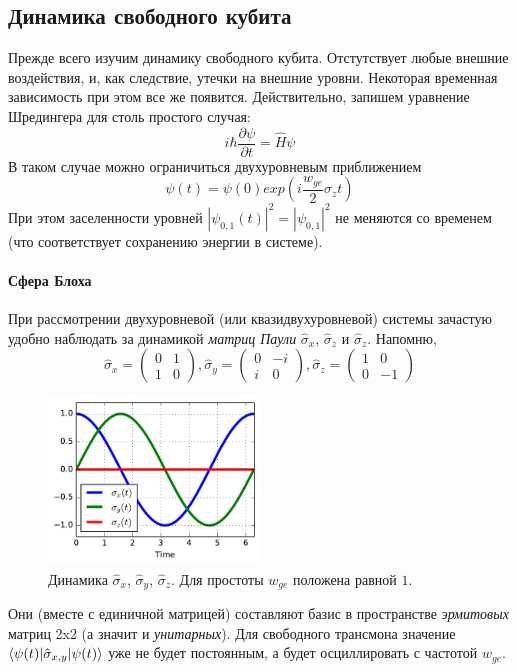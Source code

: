 \documentclass[12pt, twoside]{report}
\DeclarePairedDelimiter\bra{\langle}{\rvert}
\DeclarePairedDelimiter\ket{\lvert}{\rangle}
\numberwithin{equation}{section}
\numberwithin{figure}{section}
\begin{document}
\subsection{Динамика свободного кубита}
Прежде всего изучим динамику свободного кубита. Отстутствует любые внешние воздействия, и, как следствие, утечки на внешние уровни. Некоторая временная зависимость при этом все же появится. Действительно, запишем уравнение Шредингера для столь простого случая:
\begin{equation}
i \hbar \frac{\partial \psi} {\partial t} = \hat{H} \psi 
\label{eq:shrodinger-eq-simpliest-2d}
\end{equation}
В таком случае можно ограничиться двухуровневым приближением
\begin{equation}
\psi(t) = \psi(0) exp\left(i \frac{w_{ge}}{2} \hat{\sigma}_z t\right) 
\label{eq:shrodinger-sol-simpliest-2d}
\end{equation}
При этом заселенности уровней $|\psi_{0,1}(t)|^2 = |\psi_{0,1}|^2$ не меняются со временем (что соответствует сохранению энергии в системе). 
\paragraph{Сфера Блоха} При рассмотрении двухуровневой (или квазидвухуровневой) системы зачастую удобно наблюдать за динамикой \textit{матриц Паули} $\hat{\sigma}_x$, $\hat{\sigma}_z$ и $\hat{\sigma}_z$. Напомню, 
\begin{equation}
\hat{\sigma}_x = \left(\begin{matrix} 0 & 1 \\ 1 & 0 \end{matrix} \right),
\hat{\sigma}_y = \left(\begin{matrix} 0 & -i \\ i & 0 \end{matrix} \right),
\hat{\sigma}_z = \left(\begin{matrix} 1 & 0 \\ 0 & -1 \end{matrix} \right)
\end{equation}
\begin{figure}
\includegraphics[width=0.5\textwidth ]{Pictures2/simple-free-2d}
\caption{ Динамика $\hat{\sigma}_x$, $\hat{\sigma}_y$, $\hat{\sigma}_z$. Для простоты $w_{ge}$ положена равной $1$.}
\label{fig:simple-free-2d}
\end{figure}
Они (вместе с единичной матрицей) составляют базис в пространстве \textit{эрмитовых} матриц 2x2 (а значит и \textit{унитарных}). Для свободного трансмона значение $\bra{\psi(t)}\hat{\sigma}_{x,y}\ket{\psi(t)}$ уже не будет постоянным, а будет осциллировать с частотой $w_{ge}$. 
\end{document}
